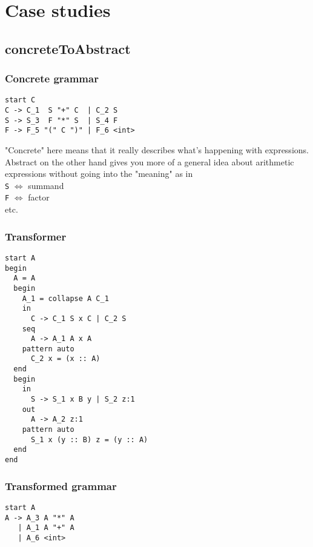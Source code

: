 \documentclass[a4paper]{article}
\begin{document}
\section*{Case studies}
\subsection*{concreteToAbstract}
\subsubsection*{Concrete grammar}
\begin{lstlisting}[language=grammar]
start C
C -> C_1  S "+" C  | C_2 S
S -> S_3  F "*" S  | S_4 F
F -> F_5 "(" C ")" | F_6 <int>
\end{lstlisting}

"Concrete" here means that it really describes what's happening with expressions. Abstract on the other hand gives you more of a general idea about arithmetic expressions without going into the "meaning" as in \\\verb|S| $\iff$ summand\\\verb|F| $\iff$ factor\\ etc.
\subsubsection*{Transformer}
\begin{lstlisting}[language=transformer]
start A
begin
  A = A
  begin
    A_1 = collapse A C_1 
    in
      C -> C_1 S x C | C_2 S
    seq
      A -> A_1 A x A
    pattern auto
      C_2 x = (x :: A)
  end
  begin
    in
      S -> S_1 x B y | S_2 z:1
    out
      A -> A_2 z:1
    pattern auto
      S_1 x (y :: B) z = (y :: A)
  end  
end
\end{lstlisting}
\subsubsection*{Transformed grammar}
\begin{lstlisting}[language=grammar]
start A
A -> A_3 A "*" A
   | A_1 A "+" A
   | A_6 <int>
\end{lstlisting}
\end{document}
